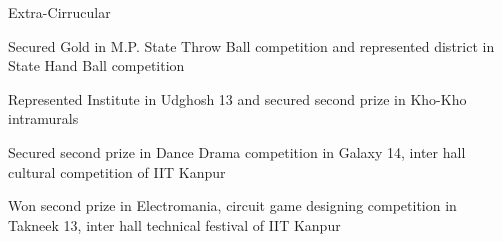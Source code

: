 \documentclass{article}
\begin{document}
\begin{rSection}{Extra-Cirrucular} \itemsep -3pt
\item Secured Gold in M.P. State Throw Ball competition and represented district in State Hand Ball competition
\item Represented Institute in Udghosh 13 and secured second prize in Kho-Kho intramurals
\item Secured second prize in Dance Drama competition in Galaxy 14, inter hall cultural competition of IIT Kanpur
\item Won second prize in Electromania, circuit game designing competition in Takneek 13, inter hall technical festival of IIT Kanpur

\end{rSection}
\end{document}
